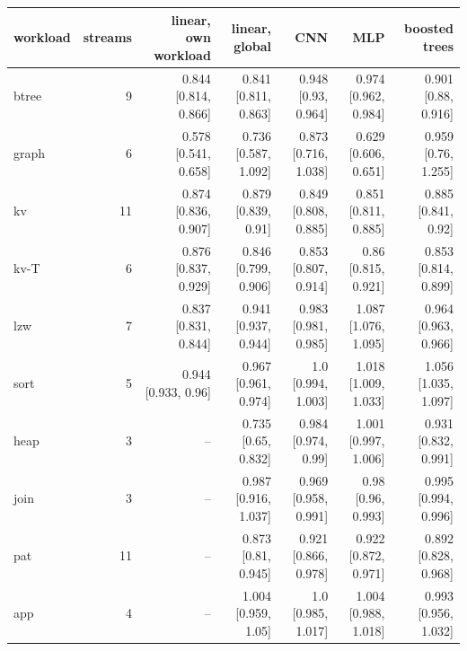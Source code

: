 \begin{tabular}{lrrrrrr}
\toprule
workload & streams & linear, own workload & linear, global & CNN & MLP & boosted trees \\
\midrule
btree & 9 & 0.844 [0.814, 0.866] & 0.841 [0.811, 0.863] & 0.948 [0.93, 0.964] & 0.974 [0.962, 0.984] & 0.901 [0.88, 0.916] \\
graph & 6 & 0.578 [0.541, 0.658] & 0.736 [0.587, 1.092] & 0.873 [0.716, 1.038] & 0.629 [0.606, 0.651] & 0.959 [0.76, 1.255] \\
kv & 11 & 0.874 [0.836, 0.907] & 0.879 [0.839, 0.91] & 0.849 [0.808, 0.885] & 0.851 [0.811, 0.885] & 0.885 [0.841, 0.92] \\
kv-T & 6 & 0.876 [0.837, 0.929] & 0.846 [0.799, 0.906] & 0.853 [0.807, 0.914] & 0.86 [0.815, 0.921] & 0.853 [0.814, 0.899] \\
lzw & 7 & 0.837 [0.831, 0.844] & 0.941 [0.937, 0.944] & 0.983 [0.981, 0.985] & 1.087 [1.076, 1.095] & 0.964 [0.963, 0.966] \\
sort & 5 & 0.944 [0.933, 0.96] & 0.967 [0.961, 0.974] & 1.0 [0.994, 1.003] & 1.018 [1.009, 1.033] & 1.056 [1.035, 1.097] \\
heap & 3 & -- & 0.735 [0.65, 0.832] & 0.984 [0.974, 0.99] & 1.001 [0.997, 1.006] & 0.931 [0.832, 0.991] \\
join & 3 & -- & 0.987 [0.916, 1.037] & 0.969 [0.958, 0.991] & 0.98 [0.96, 0.993] & 0.995 [0.994, 0.996] \\
pat & 11 & -- & 0.873 [0.81, 0.945] & 0.921 [0.866, 0.978] & 0.922 [0.872, 0.971] & 0.892 [0.828, 0.968] \\
app & 4 & -- & 1.004 [0.959, 1.05] & 1.0 [0.985, 1.017] & 1.004 [0.988, 1.018] & 0.993 [0.956, 1.032] \\
\bottomrule
\end{tabular}
